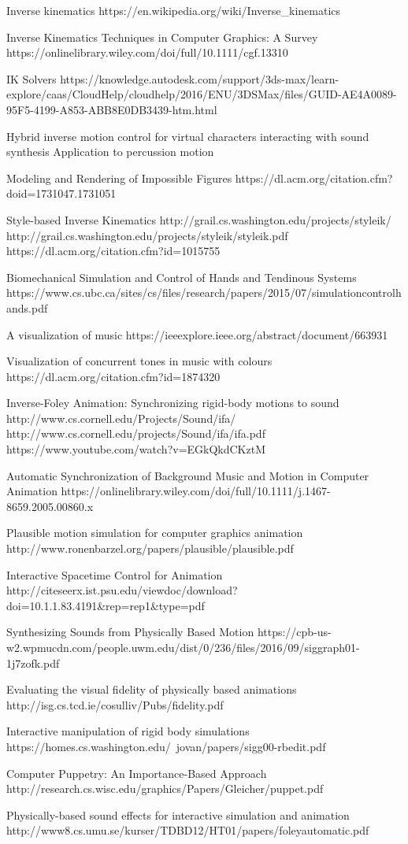 Inverse kinematics
    https://en.wikipedia.org/wiki/Inverse_kinematics

Inverse Kinematics Techniques in Computer Graphics: A Survey
    https://onlinelibrary.wiley.com/doi/full/10.1111/cgf.13310

IK Solvers
    https://knowledge.autodesk.com/support/3ds-max/learn-explore/caas/CloudHelp/cloudhelp/2016/ENU/3DSMax/files/GUID-AE4A0089-95F5-4199-A853-ABB8E0DB3439-htm.html

Hybrid inverse motion control for virtual characters interacting with sound synthesis Application to percussion motion

Modeling and Rendering of Impossible Figures
    https://dl.acm.org/citation.cfm?doid=1731047.1731051

Style-based Inverse Kinematics
    http://grail.cs.washington.edu/projects/styleik/
    http://grail.cs.washington.edu/projects/styleik/styleik.pdf
    https://dl.acm.org/citation.cfm?id=1015755

Biomechanical Simulation and Control of Hands and Tendinous Systems
    https://www.cs.ubc.ca/sites/cs/files/research/papers/2015/07/simulationcontrolhands.pdf

A visualization of music
    https://ieeexplore.ieee.org/abstract/document/663931

Visualization of concurrent tones in music with colours
    https://dl.acm.org/citation.cfm?id=1874320


Inverse-Foley Animation: Synchronizing rigid-body motions to sound
    http://www.cs.cornell.edu/Projects/Sound/ifa/
    http://www.cs.cornell.edu/projects/Sound/ifa/ifa.pdf
    https://www.youtube.com/watch?v=EGkQkdCKztM

Automatic Synchronization of Background Music and Motion in Computer Animation
    https://onlinelibrary.wiley.com/doi/full/10.1111/j.1467-8659.2005.00860.x

Plausible motion simulation for computer graphics animation
    http://www.ronenbarzel.org/papers/plausible/plausible.pdf

Interactive Spacetime Control for Animation
    http://citeseerx.ist.psu.edu/viewdoc/download?doi=10.1.1.83.4191&rep=rep1&type=pdf

Synthesizing Sounds from Physically Based Motion
    https://cpb-us-w2.wpmucdn.com/people.uwm.edu/dist/0/236/files/2016/09/siggraph01-1j7zofk.pdf

Evaluating the visual fidelity of physically based animations
    http://isg.cs.tcd.ie/cosulliv/Pubs/fidelity.pdf

Interactive manipulation of rigid body simulations
    https://homes.cs.washington.edu/~jovan/papers/sigg00-rbedit.pdf

Computer Puppetry: An Importance-Based Approach
    http://research.cs.wisc.edu/graphics/Papers/Gleicher/puppet.pdf

Physically-based sound effects for interactive simulation and animation
    http://www8.cs.umu.se/kurser/TDBD12/HT01/papers/foleyautomatic.pdf
